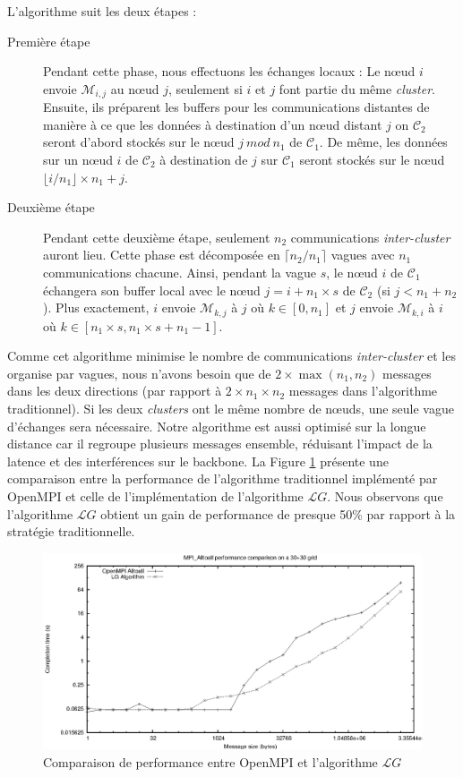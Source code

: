 L'algorithme suit les deux étapes : 
\begin{description}
	\item[Première étape] Pendant cette phase, nous effectuons les échanges locaux : Le n{\oe}ud $i$  envoie ${\mathcal M}_{i,j}$ au n{\oe}ud $j$, seulement si $i$ et $j$ font partie du même \textit{cluster}. Ensuite, ils préparent les buffers pour les communications distantes de manière à ce que les données à destination d'un n{\oe}ud distant $j$ on ${\mathcal C}_2$ seront d'abord stockés sur le n{\oe}ud $j~ mod~ n_1$ de ${\mathcal C}_1$. De même, les données sur un n{\oe}ud $i$ de ${\mathcal C}_2$ à destination de $j$ sur ${\mathcal C}_1$ seront stockés sur le n{\oe}ud $ \lfloor i/n_1 \rfloor \times n_1 + j $.
	\item[Deuxième étape] Pendant cette deuxième étape, seulement $n_2$ communications \textit{inter-cluster} auront lieu. Cette phase est décomposée en $\lceil n_2/n_1\rceil$ vagues avec $n_1$ communications chacune. Ainsi, pendant la vague $s$, le n{\oe}ud  $i$ de ${\mathcal C}_1$ échangera son buffer local avec le n{\oe}ud $j=i+n_1\times s$ de ${\mathcal C}_2$ (si $j < n_1+n_2$). Plus exactement, $i$ envoie  ${\mathcal M}_{k,j}$ à $j$ où $k\in [0,n_1]$ et $j$ envoie ${\mathcal M}_{k,i}$ à $i$ où $k\in[n_1\times s,n_1\times s+n_1-1]$.
\end{description}

Comme cet algorithme minimise le nombre de communications \textit{inter-cluster} et les organise par vagues, nous n'avons besoin que de $2\times \max(n_1,n_2)$ messages dans les deux directions (par rapport à  $2\times n_1 \times n_2$ messages dans l'algorithme traditionnel). Si les deux \textit{clusters} ont le même nombre de n{\oe}uds, une seule vague d'échanges sera nécessaire. Notre algorithme est aussi optimisé sur la longue distance car il regroupe plusieurs messages ensemble, réduisant l'impact de la latence et des interférences sur le backbone. La Figure \ref{Figure: comp} présente une comparaison entre la performance de l'algorithme traditionnel implémenté par OpenMPI et celle de l'implémentation de l'algorithme ${\mathcal LG}$. Nous observons que l'algorithme ${\mathcal LG}$ obtient un gain de performance de presque 50\% par rapport à la stratégie traditionnelle.

\begin{figure}
	\centering
	\includegraphics[width=0.7\columnwidth]{images/comp}
	\caption{\label{Figure: comp}Comparaison de performance entre OpenMPI et l'algorithme ${\mathcal LG}$}
\end{figure}

